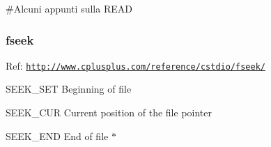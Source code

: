 \#\+Alcuni appunti sulla R\+E\+A\+D \subsubsection*{fseek}

Ref\+: \href{http://www.cplusplus.com/reference/cstdio/fseek/}{\tt http\+://www.\+cplusplus.\+com/reference/cstdio/fseek/}


\begin{DoxyItemize}
\item S\+E\+E\+K\+\_\+\+S\+E\+T Beginning of file
\item S\+E\+E\+K\+\_\+\+C\+U\+R Current position of the file pointer
\item S\+E\+E\+K\+\_\+\+E\+N\+D End of file $\ast$ 
\end{DoxyItemize}